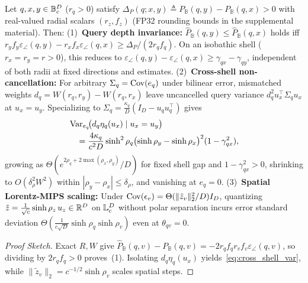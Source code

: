 \begin{theorem}
\label{thm:conformal_flip}
Let $q, x, y \in \mathbb{B}_c^D$ ($r_q > 0$) satisfy $\Delta_P(q; x, y) \triangleq P_{\mathbb{B}}(q, y) - P_{\mathbb{B}}(q, x) > 0$ with real-valued radial scalars $(r_z, f_z)$ (FP32 rounding bounds in the supplemental material). Then:
(1)~\textbf{Query depth invariance:} $\widehat{P}_{\mathbb{B}}(q, y) \le \widehat{P}_{\mathbb{B}}(q, x)$ holds iff $r_y f_y \varepsilon_\angle(q, y) - r_x f_x \varepsilon_\angle(q, x) \ge \Delta_P / (2 r_q f_q)$. On an isobathic shell ($r_x = r_y = r>0$), this reduces to $\varepsilon_\angle(q, y) - \varepsilon_\angle(q, x) \ge \gamma_{qx} - \gamma_{qy}$, independent of both radii at fixed directions and estimates.
(2)~\textbf{Cross-shell non-cancellation:} For arbitrary $\Sigma_q = \operatorname{Cov}(e_q)$ under bilinear error, mismatched weights $d_q = W(r_q, r_y) - W(r_q, r_x)$ leave uncancelled query variance $d_q^2 u_x^\top\Sigma_q u_x$ at $u_x = u_y$. Specializing to $\Sigma_q = \frac{\kappa_q}{D}(I_D - u_q u_q^\top)$ gives
\begin{equation}
  \begin{aligned}
    &\operatorname{Var}_{e_q}\!\bigl(d_q\eta_q(u_x)\mid u_x=u_y\bigr)\\
    &\quad=\frac{4\kappa_q}{c^2D}\sinh^2\rho_q
      \bigl(\sinh\rho_y-\sinh\rho_x\bigr)^2(1-\gamma_{qx}^2),
  \end{aligned}
  \label{eq:cross_shell_var}
\end{equation}
growing as $\Theta(e^{2\rho_q + 2\max(\rho_x,\rho_y)}/D)$ for fixed shell gap and $1 - \gamma_{qx}^2 > 0$, shrinking to $O(\delta_\rho^2 W^2)$ within $|\rho_y - \rho_x| \le \delta_\rho$, and vanishing at $e_q = 0$.
(3)~\textbf{Spatial Lorentz-MIPS scaling:} Under $\operatorname{Cov}(\epsilon_v) = \Theta(\|\tilde{z}_v\|_2^2 / D)I_D$, quantizing $\tilde{z} = \frac{1}{\sqrt{c}}\sinh\rho_z\,u_z \in \mathbb{R}^D$ on $\mathbb{L}_c^D$ without polar separation incurs error standard deviation $\Theta(\frac{1}{c\sqrt{D}}\sinh\rho_q\sinh\rho_v)$ even at $\theta_{qv} = 0$.
\end{theorem}
\begin{proof}[Proof Sketch]
Exact $R, W$ give $\widehat{P}_{\mathbb{B}}(q, v) - P_{\mathbb{B}}(q, v) = -2 r_q f_q r_v f_v \varepsilon_\angle(q, v)$, so dividing by $2 r_q f_q > 0$ proves~(1).
Isolating $d_q\eta_q(u_x)$ yields~\eqref{eq:cross_shell_var}, while $\|\tilde{z}_v\|_2 = c^{-1/2}\sinh\rho_v$ scales spatial steps.
\end{proof}

